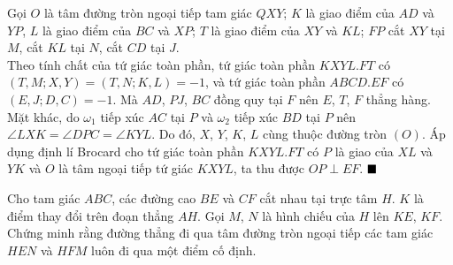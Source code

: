 \documentclass{article} %
\newenvironment{solution}[1][Lời giải]{%
  \proof[\faPenNib \hspace{0.2cm} \ttfamily \scshape \large #1]%
}{\(\hfill \blacksquare\){\parfillskip0pt\par}}
\begin{document}
        \begin{solution}
            Gọi \(O\) là tâm đường tròn ngoại tiếp tam giác \(QXY\); \(K\) là giao điểm của \(AD\) và \(YP\), \(L\) là giao điểm của \(BC\) và \(XP\); \(T\) là giao điểm của \(XY\) và \(KL\); \(FP\) cắt \(XY\) tại \(M\), cắt \(KL\) tại \(N\), cắt \(CD\) tại \(J\).\\
            Theo tính chất của tứ giác toàn phần, tứ giác toàn phần \(KXYL.FT\) có \((T,M;X,Y) = (T,N;K,L) = -1\), và tứ giác toàn phần \(ABCD.EF\) có \((E,J;D,C) = -1\). Mà \(AD\), \(PJ\), \(BC\) đồng quy tại \(F\) nên \(E\), \(T\), \(F\) thẳng hàng.\\
            Mặt khác, do \(\omega_1\) tiếp xúc \(AC\) tại \(P\) và \(\omega_2\) tiếp xúc \(BD\) tại \(P\) nên \(\angle LXK = \angle DPC = \angle KYL\). Do đó, \(X\), \(Y\), \(K\), \(L\) cùng thuộc đường tròn \((O)\). Áp dụng định lí Brocard cho tứ giác toàn phần \(KXYL.FT\) có \(P\) là giao của \(XL\) và \(YK\) và \(O\) là tâm ngoại tiếp tứ giác \(KXYL\), ta thu được \(OP \perp EF\).
        \end{solution}

        \begin{problem}
            Cho tam giác \(ABC\), các đường cao \(BE\) và \(CF\) cắt nhau tại trực tâm \(H\). \(K\) là điểm thay đổi trên đoạn thẳng \(AH\). Gọi \(M\), \(N\) là hình chiếu của \(H\) lên \(KE\), \(KF\). Chứng minh rằng đường thẳng đi qua tâm đường tròn ngoại tiếp các tam giác \(HEN\) và \(HFM\) luôn đi qua một điểm cố định.
        \end{problem}
\end{document}
